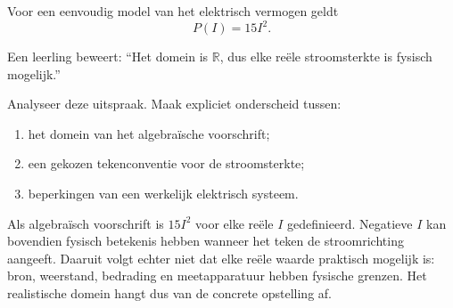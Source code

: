 \documentclass{ximera}
\begin{document}
\begin{oefening}{\oefG}

Voor een eenvoudig model van het elektrisch vermogen geldt
\[
P(I)=15I^2.
\]

Een leerling beweert:
``Het domein is \(\mathbb R\), dus elke reële stroomsterkte is fysisch mogelijk.''

Analyseer deze uitspraak. Maak expliciet onderscheid tussen:
\begin{enumerate}
    \item het domein van het algebraïsche voorschrift;
    \item een gekozen tekenconventie voor de stroomsterkte;
    \item beperkingen van een werkelijk elektrisch systeem.
\end{enumerate}

\begin{oplossing}
Als algebraïsch voorschrift is \(15I^2\) voor elke reële \(I\) gedefinieerd.
Negatieve \(I\) kan bovendien fysisch betekenis hebben wanneer het teken de
stroomrichting aangeeft. Daaruit volgt echter niet dat elke reële waarde
praktisch mogelijk is: bron, weerstand, bedrading en meetapparatuur hebben
fysische grenzen. Het realistische domein hangt dus van de concrete opstelling af.
\end{oplossing}

\end{oefening}
\end{document}
